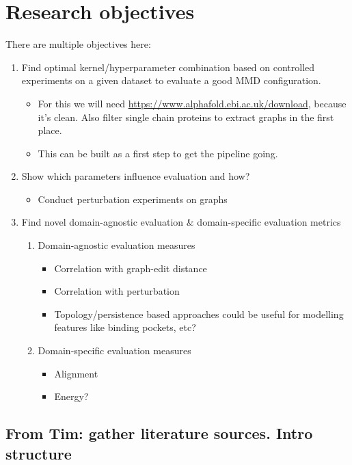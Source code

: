 \documentclass[12pt]{article}
\begin{document}
\section{Research objectives}
\label{sec:orge4418bb}
There are multiple objectives here:
\begin{enumerate}
\item Find optimal kernel/hyperparameter combination based on controlled experiments on a given dataset to evaluate a good MMD configuration.
\begin{itemize}
\item For this we will need \url{https://www.alphafold.ebi.ac.uk/download}, because it's clean. Also filter single chain proteins to extract graphs in the first place.
\item This can be built as a first step to get the pipeline going.
\end{itemize}

\item Show which parameters influence evaluation and how?
\begin{itemize}
\item Conduct perturbation experiments on graphs
\end{itemize}

\item Find novel domain-agnostic evaluation \& domain-specific evaluation metrics
\begin{enumerate}
\item Domain-agnostic evaluation measures
\begin{itemize}
\item Correlation with graph-edit distance
\item Correlation with perturbation
\item Topology/persistence based approaches could be useful for modelling features like binding pockets, etc?
\end{itemize}

\item Domain-specific evaluation measures
\begin{itemize}
\item Alignment
\item Energy?
\end{itemize}
\end{enumerate}
\end{enumerate}
\subsection{From Tim: gather literature sources. Intro structure}
\label{sec:org3d7a487}
\end{document}
